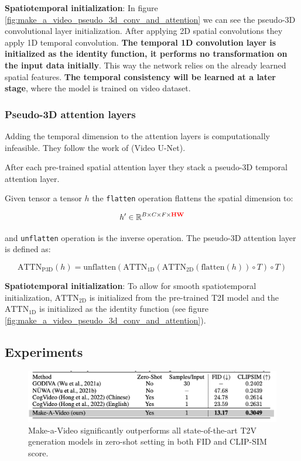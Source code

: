 \textbf{Spatiotemporal initialization}: In figure \ref{fig:make_a_video_pseudo_3d_conv_and_attention} we can see the pseudo-3D convolutional layer initialization. After applying 2D spatial convolutions they apply 1D temporal convolution. \textbf{The temporal 1D convolution layer is initialized as the identity function, it performs no transformation on the input data initially}. This way the network relies on the already learned spatial features. \textbf{The temporal consistency will be learned at a later stage}, where the model is trained on video dataset.






\subsubsection{Pseudo-3D attention layers}

Adding the temporal dimension to the attention layers is computationally infeasible. They follow the work of \cite{video_diffusion_models} (Video U-Net).

After each pre-trained spatial attention layer they stack a pseudo-3D temporal attention layer. 

Given tensor a tensor $h$ the \texttt{flatten} operation flattens the spatial dimension to: 

\[ 
h' \in \mathbb{R}^{B\times C\times F\times \mathbf{\textcolor{red}{HW}}} 
\] 

and \texttt{unflatten} operation is the inverse operation. The pseudo-3D attention layer is defined as:

\[ \text{ATTN}_{\text{P3D}} (h) = \text{unflatten} 
(\text{ATTN}_{\text{1D}} 
(\text{ATTN}_{\text{2D}} 
(\text{flatten} (h)) \circ T) \circ T) 
\]

\textbf{Spatiotemporal initialization}: To allow for smooth spatiotemporal initialization, $\text{ATTN}_{\text{2D}}$ is initialized from the pre-trained T2I model and the $\text{ATTN}_{\text{1D}}$ is initialized as the identity function (see figure \ref{fig:make_a_video_pseudo_3d_conv_and_attention}).













\subsection{Experiments}

\begin{figure}
    \centering
    \includegraphics[width=1\textwidth]{images/make_a_video/zero_shot_eval.png}
    \caption{Make-a-Video significantly outperforms all state-of-the-art T2V generation models in zero-shot setting in both FID and CLIP-SIM score.}
    \label{fig:make_a_video_zeroshot_eval}
\end{figure}